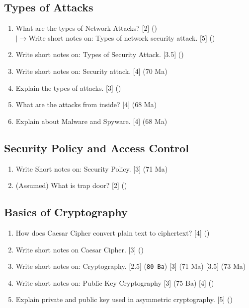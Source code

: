 \documentclass[12pt]{article}
\newcommand{\lb}{\\$\left|\rightarrow\right.$}
\begin{document}
	\subsection{Types of Attacks}
		\begin{enumerate}
			\item What are the types of Network Attacks? \hfill [2] ()
			\lb Write short notes on: Types of network security attack. \hfill [5] ()

			\item Write short notes on: Types of Security Attack. \hfill [3.5] ()

			\item Write short notes on: Security attack. \hfill [4] (70 Ma)

			\item Explain the types of attacks. \hfill [3] ()

			\item What are the attacks from inside? \hfill [4] (68 Ma)

			\item Explain about Malware and Spyware. \hfill [4] (68 Ma)
		\end{enumerate}

	\subsection{Security Policy and Access Control}
		\begin{enumerate}
			\item Write Short notes on: Security Policy. \hfill [3] (71 Ma)

			\item (Assumed) What is trap door? \hfill [2] ()
		\end{enumerate}

	\subsection{Basics of Cryptography}
		\begin{enumerate}
			\item How does Caesar Cipher convert plain text to ciphertext? \hfill [4] ()

			\item Write short notes on Caesar Cipher. \hfill [3] ()

			\item Write short notes on: Cryptography. \hfill [2.5] (\texttt{80 Ba}) [3] (71 Ma) [3.5] (73 Ma)

			\item Write short notes on: Public Key Cryptography \hfill [3] (75 Ba) [4] ()

			\item Explain private and public key used in asymmetric cryptography. \hfill [5] ()
		\end{enumerate}
\end{document}
